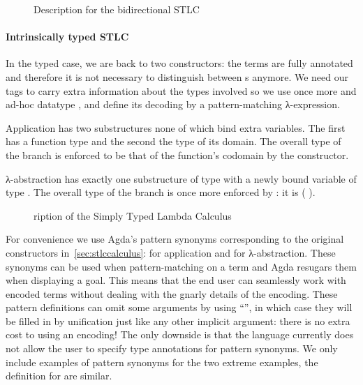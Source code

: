 \begin{figure}[h]
\noindent\begin{minipage}[t]{0.35\textwidth}
\end{minipage}
\begin{minipage}[t]{0.65\textwidth}
\end{minipage}
  \caption{Description for the bidirectional STLC\label{fig:descBidiSTLC}}
\end{figure}

\paragraph{Intrinsically typed STLC}\label{par:intrinsicSTLC}
In the typed case, we are back to two
constructors: the terms are fully annotated and therefore it is not necessary
to distinguish between s anymore. We need our tags to carry extra
information about the types involved so we use once more and ad-hoc datatype
, and define its decoding  by a pattern-matching
λ-expression.

Application has two substructures none of which bind extra variables. The first
has a function type and the second the type of its domain. The overall type of
the branch is enforced to be that of the function's codomain by the 
constructor.

λ-abstraction has exactly one substructure of type  with a newly bound
variable of type . The overall type of the branch is once more enforced
by : it is (  ).

\begin{figure}[h]
\caption{ription of the Simply Typed Lambda Calculus\label{fig:descstlc}\label{fig:descSTLC}}
\end{figure}

For convenience we use Agda's pattern synonyms corresponding to the
original constructors in~\cref{sec:stlccalculus}:
 for application and  for λ-abstraction. These
synonyms can be used when pattern-matching on a term and Agda resugars
them when displaying a goal. This means that the end user can
seamlessly work with encoded terms without dealing with the gnarly
details of the encoding.  These pattern definitions can omit some
arguments by using ``\AS{\_}'', in which case they will be filled in
by unification just like any other implicit argument: there is no
extra cost to using an encoding!  The only downside is that the
language currently does not allow the user to specify type annotations
for pattern synonyms. We only include examples of pattern synonyms
for the two extreme examples, the definition for  are similar.

